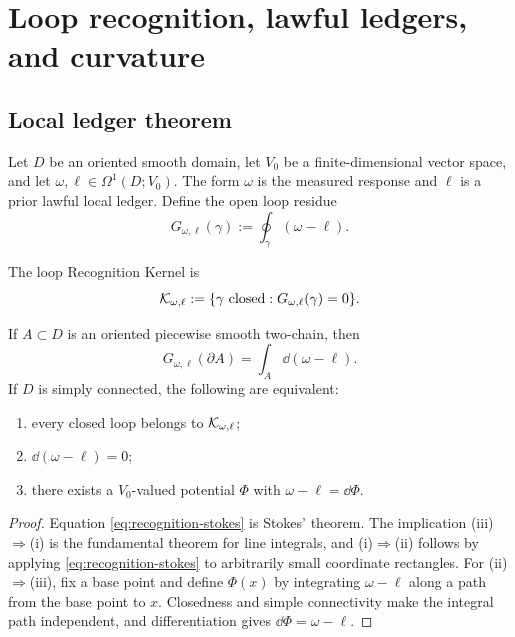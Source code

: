\section{Loop recognition, lawful ledgers, and curvature}

\subsection{Local ledger theorem}

Let $D$ be an oriented smooth domain, let $V_0$ be a finite-dimensional vector space, and let $\omega,\ell\in\Omega^1(D;V_0)$.  The form $\omega$ is the measured response and $\ell$ is a prior lawful local ledger.  Define the open loop residue
\begin{equation}
G_{\omega,\ell}(\gamma)
:=\oint_\gamma(\omega-\ell).
\label{eq:open-loop-residue}
\end{equation}

\begin{definition}
The loop Recognition Kernel is
\[
\mathcal K_{\omega,\ell}
:=\{\gamma\text{ closed}:G_{\omega,\ell}(\gamma)=0\}.
\]
\end{definition}

\begin{theorem}
If $A\subset D$ is an oriented piecewise smooth two-chain, then
\begin{equation}
G_{\omega,\ell}(\partial A)
=\int_A\dd(\omega-\ell).
\label{eq:recognition-stokes}
\end{equation}
If $D$ is simply connected, the following are equivalent:
\begin{enumerate}[label=(\roman*)]
\item every closed loop belongs to $\mathcal K_{\omega,\ell}$;
\item $\dd(\omega-\ell)=0$;
\item there exists a $V_0$-valued potential $\Phi$ with $\omega-\ell=\dd\Phi$.
\end{enumerate}
\end{theorem}

\begin{proof}
Equation \eqref{eq:recognition-stokes} is Stokes' theorem.  The implication (iii)$\Rightarrow$(i) is the fundamental theorem for line integrals, and (i)$\Rightarrow$(ii) follows by applying \eqref{eq:recognition-stokes} to arbitrarily small coordinate rectangles.  For (ii)$\Rightarrow$(iii), fix a base point and define $\Phi(x)$ by integrating $\omega-\ell$ along a path from the base point to $x$.  Closedness and simple connectivity make the integral path independent, and differentiation gives $\dd\Phi=\omega-\ell$.
\end{proof}

